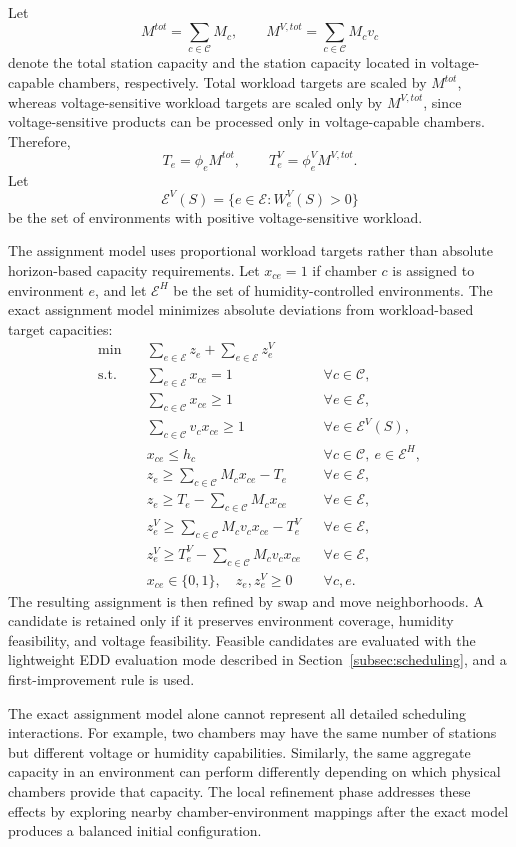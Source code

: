 \documentclass[11pt]{article}
\begin{document}
Let
\[
M^{tot}=\sum_{c\in\mathcal{C}}M_c,
\qquad
M^{V,tot}=\sum_{c\in\mathcal{C}}M_cv_c
\]
denote the total station capacity and the station capacity located in voltage-capable chambers, respectively. Total workload targets are scaled by \(M^{tot}\), whereas voltage-sensitive workload targets are scaled only by \(M^{V,tot}\), since voltage-sensitive products can be processed only in voltage-capable chambers. Therefore,
\[
T_e=\phi_e M^{tot},
\qquad
T_e^V=\phi_e^V M^{V,tot}.
\]
Let
\[
\mathcal{E}^V(S)=\{e\in\mathcal{E}: W_e^V(S)>0\}
\]
be the set of environments with positive voltage-sensitive workload.

The assignment model uses proportional workload targets rather than absolute horizon-based capacity requirements. Let \(x_{ce}=1\) if chamber \(c\) is assigned to environment \(e\), and let \(\mathcal{E}^H\) be the set of humidity-controlled environments. The exact assignment model minimizes absolute deviations from workload-based target capacities:
\begin{align}
\min\quad & \sum_{e\in\mathcal{E}}z_e+\sum_{e\in\mathcal{E}}z_e^V \\
\text{s.t.}\quad
& \sum_{e\in\mathcal{E}}x_{ce}=1 && \forall c\in\mathcal{C},\\
& \sum_{c\in\mathcal{C}}x_{ce}\ge 1 && \forall e\in\mathcal{E},\\
& \sum_{c\in\mathcal{C}}v_cx_{ce}\ge 1 && \forall e\in\mathcal{E}^V(S),\\
& x_{ce}\le h_c && \forall c\in\mathcal{C},\ e\in\mathcal{E}^H,\\
& z_e\ge \sum_{c\in\mathcal{C}}M_cx_{ce}-T_e && \forall e\in\mathcal{E},\\
& z_e\ge T_e-\sum_{c\in\mathcal{C}}M_cx_{ce} && \forall e\in\mathcal{E},\\
& z_e^V\ge \sum_{c\in\mathcal{C}}M_cv_cx_{ce}-T_e^V && \forall e\in\mathcal{E},\\
& z_e^V\ge T_e^V-\sum_{c\in\mathcal{C}}M_cv_cx_{ce} && \forall e\in\mathcal{E},\\
& x_{ce}\in\{0,1\},\quad z_e,z_e^V\ge 0 && \forall c,e.
\end{align}
The resulting assignment is then refined by swap and move neighborhoods. A candidate is retained only if it preserves environment coverage, humidity feasibility, and voltage feasibility. Feasible candidates are evaluated with the lightweight EDD evaluation mode described in Section~\ref{subsec:scheduling}, and a first-improvement rule is used.

The exact assignment model alone cannot represent all detailed scheduling interactions. For example, two chambers may have the same number of stations but different voltage or humidity capabilities. Similarly, the same aggregate capacity in an environment can perform differently depending on which physical chambers provide that capacity. The local refinement phase addresses these effects by exploring nearby chamber-environment mappings after the exact model produces a balanced initial configuration.
\end{document}
